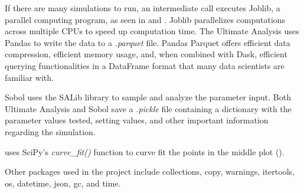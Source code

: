 If there are many simulations to run, an intermediate call executes Joblib, a parallel computing program, as seen in  and . 
Joblib parallelizes computations across multiple CPUs to speed up computation time. 
The Ultimate Analysis uses Pandas to write the data to a \textit{.parquet} file. 
Pandas Parquet offers efficient data compression, efficient memory usage, and, when combined with Dask, efficient querying functionalities in a DataFrame format that many data scientists are familiar with. 

Sobol uses the SALib library to sample and analyze the parameter input. 
Both Ultimate Analysis and Sobol save a \textit{.pickle} file containing a dictionary with the parameter values tested, setting values, and other important information regarding the simulation. 

 uses SciPy’s \textit{curve\_fit()} function to curve fit the points in the middle plot (). 

Other packages used in the project include collections, copy, warnings, itertools, os, datetime, json, gc, and time. 